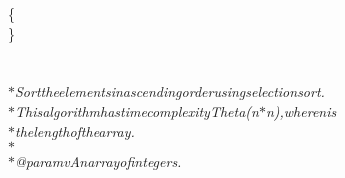 {{\begin{tabbing}
\hspace{24pt}\{\\
\hspace{24pt}\}\\
\\
\hspace{24pt}{\it{/$\ast$$\ast$}}\\
{\it{\hspace{30pt}$\ast$\hspace{6pt}Sort\hspace{6pt}the\hspace{6pt}elements\hspace{6pt}in\hspace{6pt}ascending\hspace{6pt}order\hspace{6pt}using\hspace{6pt}selection\hspace{6pt}sort.}}\\
{\it{\hspace{30pt}$\ast$\hspace{6pt}This\hspace{6pt}algorithm\hspace{6pt}has\hspace{6pt}time\hspace{6pt}complexity\hspace{6pt}Theta(n$\ast$n),\hspace{6pt}where\hspace{6pt}n\hspace{6pt}is}}\\
{\it{\hspace{30pt}$\ast$\hspace{6pt}the\hspace{6pt}length\hspace{6pt}of\hspace{6pt}the\hspace{6pt}array.}}\\
{\it{\hspace{30pt}$\ast$\hspace{6pt}}}\\
{\it{\hspace{30pt}$\ast$\hspace{6pt}@param\hspace{12pt}v\hspace{18pt}An\hspace{6pt}array\hspace{6pt}of\hspace{6pt}integers.}}\\

\end{tabbing}}}
